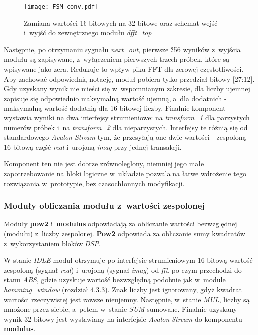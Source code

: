 \begin{figure}[h]
	\centering
	\texttt{[image: FSM\_conv.pdf]}
	\caption{Zamiana wartości 16-bitowych na 32-bitowe oraz schemat wejść i~wyjść do zewnętrznego modułu \textit{dfft\_top}}
\end{figure}
\FloatBarrier %

Następnie, po otrzymaniu sygnału \textit{next\_out}, pierwsze 256 wyników z~wyjścia modułu są zapisywane, z~wyłączeniem pierwszych trzech próbek, które są wpisywane jako zera. Redukuje to wpływ piku FFT dla zerowej częstotliwości. Aby zachować odpowiednią notację, moduł pobiera tylko przedział bitowy [27:12]. Gdy uzyskany wynik nie mieści się w~wspomnianym zakresie, dla liczby ujemnej zapisuje się odpowiednio maksymalną wartość ujemną, a~dla dodatnich - maksymalną wartość dodatnią dla 16-bitowej liczby. Finalnie komponent wystawia wyniki na dwa interfejsy strumieniowe: na \textit{transform\_1} dla parzystych numerów próbek i~na \textit{transform\_2} dla nieparzystych. Interfejsy te różnią się od standardowego \textit{Avalon Stream} tym, że przesyłają one dwie wartości - zespoloną 16-bitową część \textit{real} i~urojoną \textit{imag} przy jednej transakcji.

Komponent ten nie jest dobrze zrównoleglony, niemniej jego małe zapotrzebowanie na bloki logiczne w~układzie pozwala na łatwe wdrożenie tego rozwiązania w~prototypie, bez czasochłonnych modyfikacji.


\subsubsection{Moduły obliczania modułu z~wartości zespolonej}

Moduły \textbf{pow2} i~\textbf{modulus} odpowiadają za obliczanie wartości bezwzględnej (modułu) z~liczby zespolonej. \textbf{Pow2} odpowiada za obliczanie sumy kwadratów z~wykorzystaniem bloków \textit{DSP}.

W stanie \textit{IDLE} moduł otrzymuje po interfejsie strumieniowym 16-bitową wartość zespoloną (sygnał \textit{real}) i~urojoną (sygnał \textit{imag}) od \textit{fft}, po czym przechodzi do stanu \textit{ABS}, gdzie uzyskuje wartość bezwzględną podobnie jak w~module \textit{hamming\_window} (rozdział 4.3.3). Znak liczby jest ignorowany, gdyż kwadrat wartości rzeczywistej jest zawsze nieujemny. Następnie, w~stanie \textit{MUL}, liczby są mnożone przez siebie, a~potem w~stanie \textit{SUM} sumowane. Finalnie uzyskany wynik 32-bitowy jest wystawiany na interfejsie \textit{Avalon Stream} do komponentu \textbf{modulus}.

